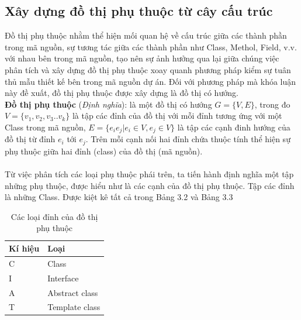 \documentclass[12pt]{report}
\begin{document}
\subsection{Xây dựng đồ thị phụ thuộc từ cây cấu trúc}
Đồ thị phụ thuộc nhằm thể hiện mối quan hệ về cấu trúc giữa các thành phần trong mã nguồn, sự tương tác giữa các thành phần như Class, Methol, Field, v.v. với nhau bên trong mã nguồn, tạo nên sự ảnh hưởng qua lại giữa chúng
việc phân tích và xây dựng đồ thị phụ thuộc xoay quanh phương pháp kiểm sự tuân thủ mẫu thiết kế bên trong mã nguồn dự án.
Đối với phương pháp mà khóa luận này đề xuất, đồ thị phụ thuộc được xây dựng là đồ thị có hướng.\\
\noindent \textbf{Đồ thị phụ thuộc} (\textit{Định nghĩa}): là một đồ thị có hướng $G = \{V,E \}$, trong đo $V = \{v_1,v_2,v_3..v_k\}$ là tập các đỉnh của đồ thị với mỗi đỉnh tương ứng với một Class trong mã nguồn, $E = \{ e_ie_j | e_i \in V, e_j \in V  \}$ là tập các cạnh đinh hướng của đồ thị từ đỉnh $e_i$ tới $e_j$. Trên mỗi cạnh nối hai đỉnh chứa thuộc tính thể hiện sự phụ thuộc giữa hai đỉnh (class) của đồ thị (mã nguồn).\\\\
\noindent Từ việc phân tích các loại phụ thuộc phái trên, ta tiến hành định nghĩa một tập những phụ thuộc, được hiểu như là các cạnh của đồ thị phụ thuộc. Tập các đỉnh là những Class. Được kiệt kê tất cả trong Bảng 3.2 và Bảng 3.3 \cite{orucc2016}
\begin{table}[!htbp]
	\centering
	\caption{Các loại đỉnh của đồ thị phụ thuộc}
	\label{tbl:java-class-type}
	\renewcommand{\arraystretch}{0.7}
	\begin{tabular}{|p{2.7cm}|p{8.7cm}|}
		\hline
		\textbf{Kí hiệu} & \textbf{Loại} \\ \hline
		C				& Class\\ \hline
		I				& Interface \\ \hline
		A				& Abstract class \\ \hline
		T				& Template class \\ \hline         
	\end{tabular}
\end{table}
\end{document}
